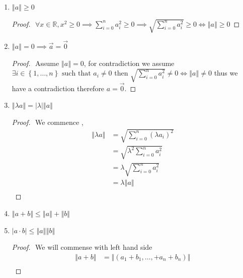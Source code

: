 \documentclass[11pt]{book}
\begin{document}
\begin{enumerate}
    \item $\left\Vert a \right\Vert \ge 0$
        \begin{proof}
        $ $\newline
            $\forall x \in \mathbb{R} , x^2 \ge 0 \implies \sum_{i=0}^{n} a_{i} ^2 \ge 0 \implies \sqrt{\sum_{i=0}^{n} a_{i} ^2  } \ge 0 \Leftrightarrow \left\Vert a \right\Vert \ge 0$
        \end{proof}
    \item $\left\Vert a \right\Vert = 0 \implies \vec{a} = \vec{0} $
        \begin{proof}
        $ $\newline
            Assume $\left\Vert a \right\Vert = 0$, for contradiction we assume $\exists i \in \left\{ 1, \ldots , n \right\} \text{ such that } a_{i} \neq 0 $  then $\sqrt{\sum_{i=0}^{n} a_{i} ^2}  \neq 0 \Leftrightarrow \left\Vert a \right\Vert \neq 0$ thus we have a contradiction therefore $a = \vec{0} $.  
        \end{proof}
    \item $\left\Vert \lambda a \right\Vert = \left| \lambda  \right| \left\Vert a \right\Vert $ 
    \begin{proof}
    $ $\newline
    We commence ,
    \begin{align*}
        \left\Vert \lambda a \right\Vert &= \sqrt{\sum_{i=0}^{n} \left( \lambda a_{i}  \right) ^2  } \\
        &= \sqrt{\lambda ^2 \sum_{i=0}^{n} a_{i} ^2  }   \\ 
        &= \lambda \sqrt{\sum_{i=0}^{n} a_{i} ^2  }   \\ &= \lambda \left\Vert a \right\Vert   \\ 
    \end{align*}
    \end{proof}
    \item $\left\Vert a + b \right\Vert \le \left\Vert a \right\Vert  + \left\Vert b \right\Vert $ 
    \item $\left| a \cdot b \right| \le \left\Vert a \right\Vert \left\Vert b \right\Vert $ 
    \begin{proof}
    $ $\newline
    We will commense with left hand side 
        \begin{align*}
            \left\Vert a + b \right\Vert &= \left\Vert \left( a_1 + b_1, \ldots ,  + a_{n}  + b_{n}  \right)  \right\Vert   \\ 

\end{align*}
\end{proof}
\end{enumerate}
\end{document}
